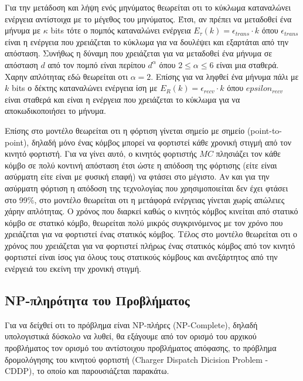 Για την μετάδοση και λήψη ενός μηνύματος θεωρείται οτι το κύκλωμα καταναλώνει ενέργεια αντίστοιχα με το μέγεθος του μηνύματος. Έτσι, αν πρέπει να μεταδοθεί ένα
μήνυμα με $κ$ bits τότε ο πομπός καταναλώνει ενέργεια $E_{\tau}(k) = \epsilon_{trans}\cdot k$ όπου $\epsilon_{trans}$ είναι η ενέργεια που
χρειάζεται το κύκλωμα για να δουλέψει και εξαρτάται από την απόσταση. Συνήθως η δύναμη που χρειάζεται για να μεταδοθεί ένα μήνυμα σε απόσταση $d$ από τον πομπό είναι
περίπου $d^{\alpha}$ όπου $2\leq\alpha\leq6$ είναι μια σταθερά. Χαρην απλότητας εδώ θεωρείται οτι $\alpha = 2$. Επίσης για να ληφθεί ένα μήνυμα πάλι με $k$ bits ο
δέκτης καταναλώνει ενέργεια ίση με $E_{R}(k) = \epsilon_{recv}\cdot k$ όπου $epsilon_{recv}$ είναι σταθερά και είναι η ενέργεια που χρειάζεται το κύκλωμα για να
αποκωδικοποιήσει το μήνυμα.

Επίσης στο μοντέλο θεωρείται οτι η φόρτιση γίνεται σημείο με σημείο (point-to-point), δηλαδή μόνο ένας κόμβος μπορεί να φορτιστεί κάθε χρονική στιγμή από τον κινητό
φορτιστή. Για να γίνει αυτό, ο κινητός φορτιστής $MC$ πλησιάζει τον κάθε κόμβο σε πολύ κοντινή απόσταση έτσι ώστε η απόδοση της φόρτισης (είτε είναι ασύρματη είτε
είναι με φυσική επαφή) να φτάσει στο μέγιστο. Αν και για την ασύρματη φόρτιση η απόδοση της τεχνολογίας που χρησιμοποιείται δεν έχει φτάσει στο 99\%, στο μοντέλο
θεωρείται οτι η μετάφορά ενέργειας γίνεται χωρίς απώλειες χάρην απλότητας. Ο χρόνος που διαρκεί καθώς ο κινητός κόμβος κινείται από στατικό κόμβο σε στατικό κόμβο,
θεωρείται πολύ μικρός συγκρινόμενος με τον χρόνο που χρειάζεται για να φορτιστεί ένας στατικός κόμβος. Τέλος στο μοντέλο θεωρείται οτι ο χρόνος που χρειάζεται για να
φορτιστεί πλήρως ένας στατικός κόμβος από τον κινητό φορτιστεί είναι ίσος για όλους τους στατικούς κόμβους και ανεξάρτητος από την ενέργειά του εκείνη την χρονική
στιγμή.


\subsection{NP-πληρότητα του Προβλήματος}
Για να δείχθεί οτι το πρόβλημα είναι NP-πλήρες (NP-Complete), δηλαδή υπολογιστικά δύσκολο να λυθεί, θα εξάγουμε από τον ορισμό του αρχικού προβλήματος τον ορισμό του
αντίστοιχου προβλήματος απόφασης, το πρόβλημα δρομολόγησης του κινητού φορτιστή  (Charger Dispatch Dicision Problem - CDDP), το οποίο και παρουσιάζεται παρακάτω.

